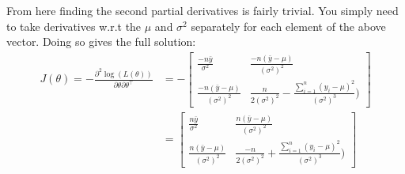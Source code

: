 From here finding the second partial derivatives is fairly trivial.
You simply need to take derivatives w.r.t the $\mu$ and $\sigma^2$ separately for each element of the above vector.
Doing so gives the full solution:
\begin{align}
    J(\theta) = -\frac{\partial^2 \log(L(\theta))}{\partial \theta \partial \theta^\intercal} 
    &= 
    -\begin{bmatrix}
        \frac{-n\bar{y}}{\sigma^2} & \frac{-n(\bar{y}-\mu)}{(\sigma^2)^2}\nonumber\\
        \frac{-n(\bar{y}-\mu)}{(\sigma^2)^2} & \frac{n}{2(\sigma^2)^2} -\frac{\sum_{i=1}^n (y_i - \mu)^2 }{(\sigma^2)^3}\Big)
    \end{bmatrix}
    \\
    &= 
    \begin{bmatrix}
        \frac{n\bar{y}}{\sigma^2} & \frac{n(\bar{y}-\mu)}{(\sigma^2)^2}\nonumber\\
    \frac{n(\bar{y}-\mu)}{(\sigma^2)^2} & \frac{-n}{2(\sigma^2)^2} +\frac{\sum_{i=1}^n (y_i - \mu)^2 }{(\sigma^2)^3}\Big)
    \end{bmatrix}
\end{align}




